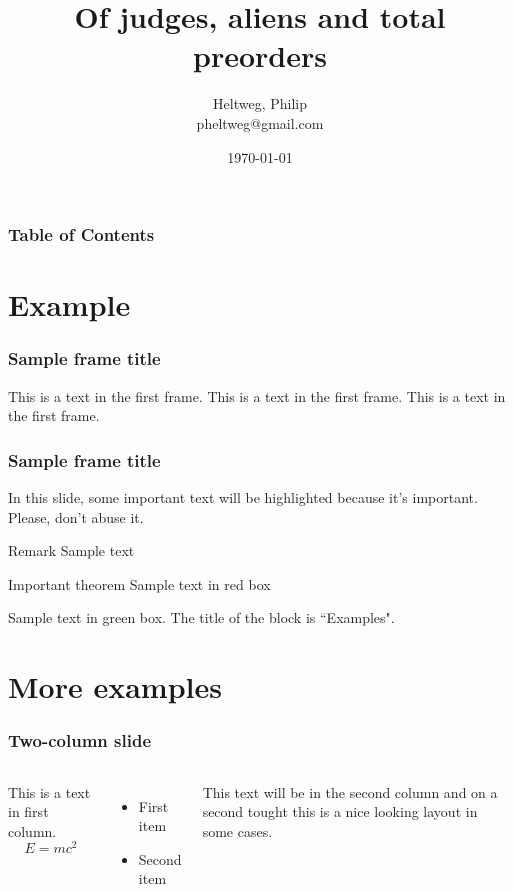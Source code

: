 \documentclass[11pt]{beamer}
\begin{document}
\title{Of judges, aliens and total preorders}
\author[Heltweg, Philip]{Heltweg, Philip\\pheltweg@gmail.com}
\date{\today}

\frame{\titlepage}

\begin{frame}
    \frametitle{Table of Contents}
    \tableofcontents
\end{frame}

\section{Example}

\begin{frame}
    \frametitle{Sample frame title}
    This is a text in the first frame. This is a text in the first frame. This is a text in the first frame.
\end{frame}

\begin{frame}
\frametitle{Sample frame title}

In this slide, some important text will be
\alert{highlighted} because it's important.
Please, don't abuse it.

\begin{block}{Remark}
Sample text
\end{block}

\begin{alertblock}{Important theorem}
Sample text in red box
\end{alertblock}

\begin{examples}
Sample text in green box. The title of the block is ``Examples".
\end{examples}
\end{frame}

\section{More examples}

\begin{frame}
\frametitle{Two-column slide}

\begin{columns}

This is a text in first column.
$$E=mc^2$$
\begin{itemize}
\item First item
\item Second item
\end{itemize}

This text will be in the second column
and on a second tought this is a nice looking
layout in some cases.
\end{columns}
\end{frame}
\end{document}
